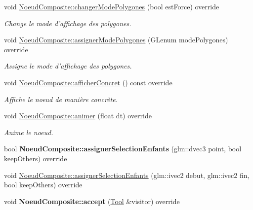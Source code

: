 \begin{DoxyCompactItemize}
void \hyperlink{group__inf2990_ga90bb01067866438b80d081967c133b81}{Noeud\-Composite\-::changer\-Mode\-Polygones} (bool est\-Force) override
\begin{DoxyCompactList}\small\item\em Change le mode d'affichage des polygones. \end{DoxyCompactList}\item 
void \hyperlink{group__inf2990_ga5caf8a3f9e06915463abdff7a473d95f}{Noeud\-Composite\-::assigner\-Mode\-Polygones} (G\-Lenum mode\-Polygones) override
\begin{DoxyCompactList}\small\item\em Assigne le mode d'affichage des polygones. \end{DoxyCompactList}\item 
void \hyperlink{group__inf2990_ga023450b00e424ff3600a93a6c844b4ad}{Noeud\-Composite\-::afficher\-Concret} () const override
\begin{DoxyCompactList}\small\item\em Affiche le noeud de manière concrète. \end{DoxyCompactList}\item 
void \hyperlink{group__inf2990_gac641c70147959a57b698854e016ff929}{Noeud\-Composite\-::animer} (float dt) override
\begin{DoxyCompactList}\small\item\em Anime le noeud. \end{DoxyCompactList}\item 
\hypertarget{group__inf2990_ga60b49df4f31e029056837529970ef67f}{bool {\bfseries Noeud\-Composite\-::assigner\-Selection\-Enfants} (glm\-::dvec3 point, bool keep\-Others) override}\label{group__inf2990_ga60b49df4f31e029056837529970ef67f}

\item 
void \hyperlink{group__inf2990_ga98e4e00d1d92ebe6774f72dc712ee6ca}{Noeud\-Composite\-::assigner\-Selection\-Enfants} (glm\-::ivec2 debut, glm\-::ivec2 fin, bool keep\-Others) override
\item 
\hypertarget{group__inf2990_ga0b60c180726f3a0501f42bc70bc0c52e}{void {\bfseries Noeud\-Composite\-::accept} (\hyperlink{class_tool}{Tool} \&visitor) override}\label{group__inf2990_ga0b60c180726f3a0501f42bc70bc0c52e}


\end{DoxyCompactItemize}
